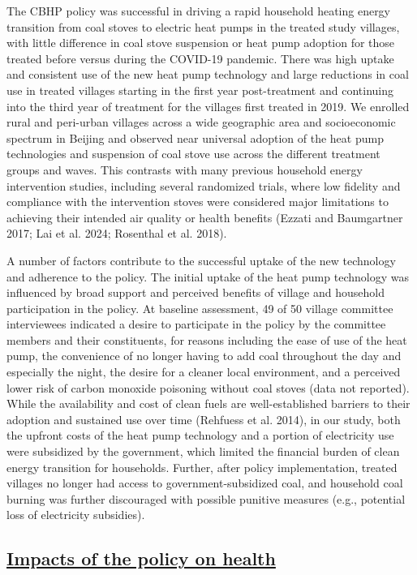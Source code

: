 \documentclass[
  letterpaper,
  DIV=11,
  numbers=noendperiod]{scrartcl}
\providecommand{\DIFadd}[1]{{\protect\color{blue}\underline{#1}}} %
\providecommand{\DIFaddbegin}{} %
\providecommand{\DIFaddend}{} %
\providecommand{\DIFdelbegin}{} %
\providecommand{\DIFdelend}{} %
\newcommand{\DIFscaledelfig}{0.5}
\newlength{\DIFdelgraphicswidth} %
\newlength{\DIFdelgraphicsheight} %
\newcommand{\DIFaddincludegraphics}[2][]{{\color{blue}\fbox{\DIFOincludegraphics[#1]{#2}}}} %
\newcommand{\DIFdelincludegraphics}[2][]{%
\sbox{\DIFdelgraphicsbox}{\DIFOincludegraphics[#1]{#2}}%
\settoboxwidth{\DIFdelgraphicswidth}{\DIFdelgraphicsbox} %
\settoboxtotalheight{\DIFdelgraphicsheight}{\DIFdelgraphicsbox} %
\scalebox{\DIFscaledelfig}{%
\parbox[b]{\DIFdelgraphicswidth}{\usebox{\DIFdelgraphicsbox}\\[-\baselineskip] \rule{\DIFdelgraphicswidth}{0em}}\llap{\resizebox{\DIFdelgraphicswidth}{\DIFdelgraphicsheight}{%
\setlength{\unitlength}{\DIFdelgraphicswidth}%
\begin{picture}(1,1)%
\thicklines\linethickness{2pt} %
{\color[rgb]{1,0,0}\put(0,0){\framebox(1,1){}}}%
{\color[rgb]{1,0,0}\put(0,0){\line( 1,1){1}}}%
{\color[rgb]{1,0,0}\put(0,1){\line(1,-1){1}}}%
\end{picture}%
}\hspace*{3pt}}} %
} %
\DeclareRobustCommand{\DIFaddbegin}{\DIFOaddbegin \let\includegraphics\DIFaddincludegraphics} %
\DeclareRobustCommand{\DIFaddend}{\DIFOaddend \let\includegraphics\DIFOincludegraphics} %
\DeclareRobustCommand{\DIFdelbegin}{\DIFOdelbegin \let\includegraphics\DIFdelincludegraphics} %
\DeclareRobustCommand{\DIFdelend}{\DIFOaddend \let\includegraphics\DIFOincludegraphics} %
\begin{document}
The CBHP policy was successful in driving a rapid household heating
energy transition from coal stoves to electric heat pumps in the treated
study villages, with little difference in coal stove suspension or heat
pump adoption for those treated before versus during the COVID-19
pandemic. There was high uptake and consistent use of the new heat pump
technology and large reductions in coal use in treated villages starting
in the first year post-treatment and continuing into the third year of
treatment for the villages first treated in 2019. We enrolled rural and
peri-urban villages across a wide geographic area and socioeconomic
spectrum in Beijing and observed near universal adoption of the heat
pump technologies and suspension of coal stove use across the different
treatment groups and waves. This contrasts with many previous household
energy intervention studies, including several randomized trials, where
low fidelity and compliance with the intervention stoves were considered
major limitations to achieving their intended air quality or health
benefits (Ezzati and Baumgartner 2017; Lai et al. 2024; Rosenthal et al.
2018).

A number of factors contribute to the successful uptake of the new
technology and adherence to the policy. The initial uptake of the heat
pump technology was influenced by broad support and perceived benefits
of village and household participation in the policy. At baseline
assessment, 49 of 50 village committee interviewees indicated a desire
to participate in the policy by the committee members and their
constituents, for reasons including the ease of use of the heat pump,
the convenience of no longer having to add coal throughout the day and
especially the night, the desire for a cleaner local environment, and a
perceived lower risk of carbon monoxide poisoning without coal stoves
(data not reported). While the availability and cost of clean fuels are
well-established barriers to their adoption and sustained use over time
(Rehfuess et al. 2014), in our study, both the upfront costs of the heat
pump technology and a portion of electricity use were subsidized by the
government, which limited the financial burden of clean energy
transition for households. Further, after policy implementation, treated
villages no longer had access to government-subsidized coal, and
household coal burning was further discouraged with possible punitive
measures (e.g., potential loss of electricity subsidies).

\DIFdelbegin %
\DIFdelend \DIFaddbegin \subsection{\DIFadd{Impacts of the policy on
health}}\label{impacts-of-the-policy-on-health}
\DIFaddend 
\end{document}
